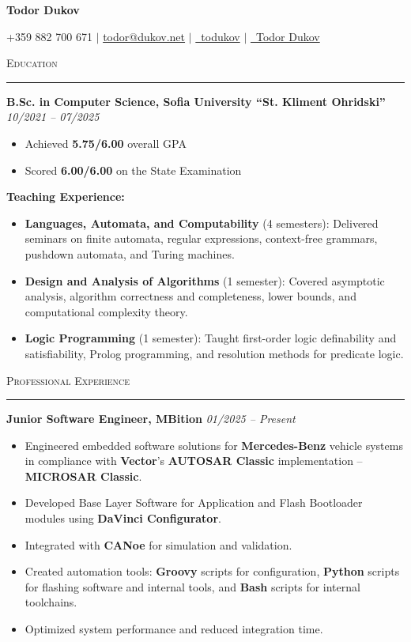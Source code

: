 \documentclass[a4paper,10pt]{article}
\newcommand{\textwithhr}[1]{
\textsc{#1}

\vspace{1mm}
\hrule \hfill
}
\begin{document}
\begin{center}
    \huge{\textbf{Todor Dukov}}

    \normalsize{+359 882 700 671 $\mid$ \href{mailto:todor@dukov.net}{todor@dukov.net} $\mid$ \href{https://github.com/toduko}{\faGithubSquare \, todukov} $\mid$ \href{https://www.linkedin.com/in/todor-dukov}{\faLinkedinSquare \, Todor Dukov}}
\end{center}

\textwithhr{Education}

\textbf{B.Sc. in Computer Science, Sofia University “St. Kliment Ohridski”} \hspace*{\fill} \textit{10/2021 -- 07/2025}

\begin{itemize}
    \item Achieved \textbf{5.75/6.00} overall GPA
    \item Scored \textbf{6.00/6.00} on the State Examination
\end{itemize}

\textbf{Teaching Experience:}
\begin{itemize}
  \item \textbf{Languages, Automata, and Computability} (4 semesters):  
        Delivered seminars on finite automata, regular expressions, context-free grammars, pushdown automata, and Turing machines.
  \item \textbf{Design and Analysis of Algorithms} (1 semester):  
        Covered asymptotic analysis, algorithm correctness and completeness, lower bounds, and computational complexity theory.
  \item \textbf{Logic Programming} (1 semester):  
        Taught first-order logic definability and satisfiability, Prolog programming, and resolution methods for predicate logic.
\end{itemize}

\textwithhr{Professional Experience}

\textbf{Junior Software Engineer, MBition} \hspace*{\fill} \textit{01/2025 -- Present}
\begin{itemize}
\item Engineered embedded software solutions for \textbf{Mercedes-Benz} vehicle systems in compliance with \textbf{Vector}'s \textbf{AUTOSAR Classic} implementation -- \textbf{MICROSAR Classic}.
    \item Developed Base Layer Software for Application and Flash Bootloader modules using \textbf{DaVinci Configurator}.
    \item Integrated with \textbf{CANoe} for simulation and validation.
    \item Created automation tools: \textbf{Groovy} scripts for configuration, \textbf{Python} scripts for flashing software and internal tools, and \textbf{Bash} scripts for internal toolchains.
    \item Optimized system performance and reduced integration time.
\end{itemize}
\end{document}
